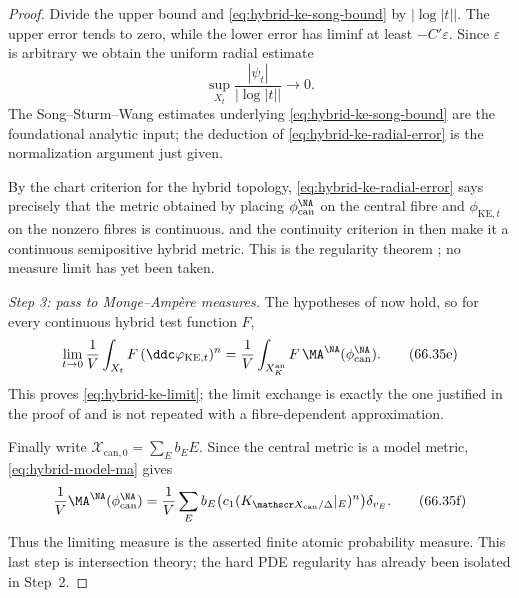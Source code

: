 \begin{proof}
Divide the upper bound and \eqref{eq:hybrid-ke-song-bound} by
$|\log|t||$.  The upper error tends to zero, while the lower error has
liminf at least $-C'\varepsilon$.  Since $\varepsilon$ is arbitrary
we obtain the uniform
radial estimate
\[
       \sup_{X_t}
       \frac{|\psi_t|}{|\log|t||}
             \longrightarrow0.
\tag{66.35d}\label{eq:hybrid-ke-radial-error}
\]
The Song--Sturm--Wang estimates underlying
\eqref{eq:hybrid-ke-song-bound} are the foundational analytic input; the
deduction of \eqref{eq:hybrid-ke-radial-error} is the normalization
argument just given.

By the chart criterion for the hybrid topology,
\eqref{eq:hybrid-ke-radial-error} says precisely that the metric obtained
by placing $\phi_{\mathrm{can}}^{\NA}$ on the central fibre and
$\phi_{\mathrm{KE},t}$ on the nonzero fibres is continuous.
 and the continuity criterion in
\cite[Proposition~3.16]{PS23Hybrid} then make it a continuous semipositive
hybrid metric.  This is the regularity theorem
\cite[Theorem~5.1]{PS23Hybrid}; no measure limit has yet been taken.

\smallskip
\noindent\emph{Step 3: pass to Monge--Amp\`ere measures.}
The hypotheses of  now hold, so for every
continuous hybrid test function $F$,
\[
 \lim_{t\to0}
 \frac1V\int_{X_t}F\,(\ddc\varphi_{\mathrm{KE},t})^n
 =
 \frac1V\int_{X_K^{\mathrm{an}}}F\,
       \MA^{\NA}(\phi_{\mathrm{can}}^{\NA}).
\tag{66.35e}\label{eq:hybrid-ke-limit-test}
\]
This proves \eqref{eq:hybrid-ke-limit}; the limit exchange is exactly the
one justified in the proof of  and is not
repeated with a fibre-dependent approximation.

Finally write
$\mathscr X_{\mathrm{can},0}=\sum_E b_EE$.  Since the central metric is a
model metric, \eqref{eq:hybrid-model-ma} gives
\[
 \frac1V\MA^{\NA}(\phi_{\mathrm{can}}^{\NA})
  =\frac1V\sum_E
       b_E\bigl(c_1(K_{\mathscr X_{\mathrm{can}}/\Delta}|_E)^n\bigr)
       \delta_{v_E}.
\tag{66.35f}\label{eq:hybrid-ke-atomic-formula}
\]
Thus the limiting measure is the asserted finite atomic probability
measure.  This last step is intersection theory; the hard PDE regularity
has already been isolated in Step~2.
\end{proof}

